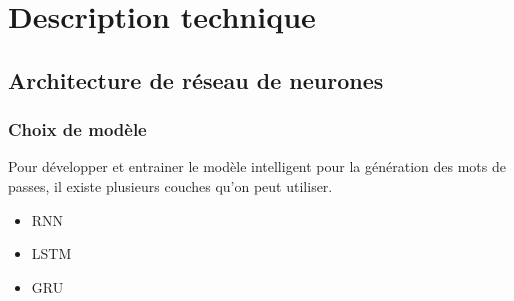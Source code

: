 \section{Description technique}
\subsection{Architecture de réseau de neurones}
\subsubsection{Choix de modèle}
Pour développer et entrainer le modèle intelligent pour la génération des mots de passes, il existe plusieurs couches qu'on peut utiliser.
\begin{itemize}
    \item RNN
    \item LSTM
    \item GRU
\end{itemize}